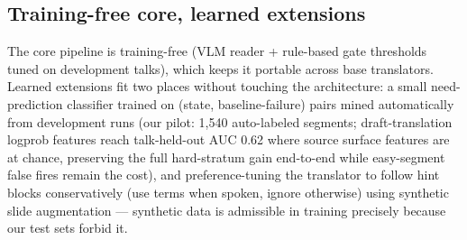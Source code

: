 \subsection{Training-free core, learned extensions}

The core pipeline is training-free (VLM reader + rule-based gate thresholds
tuned on development talks), which keeps it portable across base translators.
Learned extensions fit two places without touching the architecture: a small
need-prediction classifier trained on (state, baseline-failure) pairs mined
automatically from development runs (our pilot: 1{,}540 auto-labeled segments;
draft-translation logprob features reach talk-held-out AUC 0.62 where source
surface features are at chance, preserving the full hard-stratum gain
end-to-end while easy-segment false fires remain the cost), and preference-tuning the translator to follow hint
blocks conservatively (use terms when spoken, ignore otherwise) using
synthetic slide augmentation \citep{sinhamahapatra2025slides} --- synthetic
data is admissible in training precisely because our test sets forbid it.
